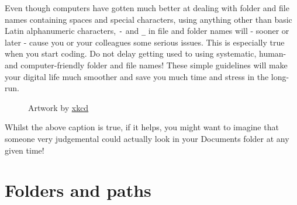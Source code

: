 \documentclass[
  letterpaper,
  DIV=11,
  numbers=noendperiod]{scrreprt}
\begin{document}
Even though computers have gotten much better at dealing with folder and
file names containing spaces and special characters, using anything
other than basic Latin alphanumeric characters, \texttt{-} and
\texttt{\_} in file and folder names will - sooner or later - cause you
or your colleagues some serious issues. This is especially true when you
start coding. Do not delay getting used to using systematic, human- and
computer-friendly folder and file names! These simple guidelines will
make your digital life much smoother and save you much time and stress
in the long-run.

\begin{figure}


\caption{\label{fig-FileNamesComic}Artwork by
\href{https://xkcd.com/1459/}{xkcd}}

\end{figure}%

Whilst the above caption is true, if it helps, you might want to imagine
that someone very judgemental could actually look in your Documents
folder at any given time!

\section{Folders and paths}\label{folders-and-paths}
\end{document}
